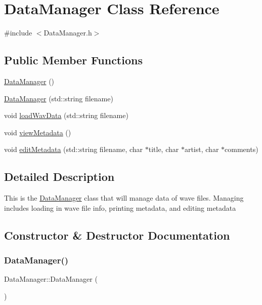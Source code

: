 \hypertarget{classDataManager}{}\section{Data\+Manager Class Reference}
\label{classDataManager}


{\ttfamily \#include $<$Data\+Manager.\+h$>$}

\subsection*{Public Member Functions}
\begin{DoxyCompactItemize}
\item 
\hyperlink{classDataManager_ac2eec7fa355109eda41308e1de76d2a8}{Data\+Manager} ()
\item 
\hyperlink{classDataManager_aabcf390e86b29a8d73379627dc846d78}{Data\+Manager} (std\+::string filename)
\item 
void \hyperlink{classDataManager_a36752f6ca1c17b414ac256f90fe304e3}{load\+Wav\+Data} (std\+::string filename)
\item 
void \hyperlink{classDataManager_a90616c9fb33193856877a90e6583ef97}{view\+Metadata} ()
\item 
void \hyperlink{classDataManager_a7a63326e53ccb571e42a1bfc0befe90d}{edit\+Metadata} (std\+::string filename, char $\ast$title, char $\ast$artist, char $\ast$comments)
\end{DoxyCompactItemize}


\subsection{Detailed Description}
This is the \hyperlink{classDataManager}{Data\+Manager} class that will manage data of wave files. Managing includes loading in wave file info, printing metadata, and editing metadata 

\subsection{Constructor \& Destructor Documentation}
\mbox{\label{classDataManager_ac2eec7fa355109eda41308e1de76d2a8}} 
\subsubsection{\texorpdfstring{Data\+Manager()}{DataManager()}\hspace{0.1cm}{\footnotesize\ttfamily [1/2]}}
{\footnotesize\ttfamily Data\+Manager\+::\+Data\+Manager (\begin{DoxyParamCaption}{ }\end{DoxyParamCaption})}

